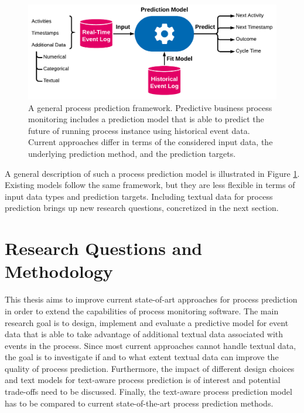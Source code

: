 \begin{figure}[htbp!]
	\centering
	\includegraphics[width=\textwidth]{figures/problem-description}
	\caption[A general process prediction framework]{A general process prediction framework. Predictive business process monitoring includes a prediction model that is able to predict the future of running process instance using historical event data. Current approaches differ in terms of the considered input data, the underlying prediction method, and the prediction targets.}
	\label{fig:/problem-description}
\end{figure}

A general description of such a process prediction model is illustrated in Figure \ref{fig:/problem-description}.
Existing models follow the same framework, but they are less flexible in terms of input data types and prediction targets.
Including textual data for process prediction brings up new research questions, concretized in the next section.

\section{Research Questions and Methodology}\label{sec:methodology}

This thesis aims to improve current state-of-art approaches for process prediction in order to extend the capabilities of process monitoring software.
The main research goal is to design, implement and evaluate a predictive model for event data that is able to take advantage of additional textual data associated with events in the process.
Since most current approaches cannot handle textual data, the goal is to investigate if and to what extent textual data can improve the quality of process prediction.
Furthermore, the impact of different design choices and text models for text-aware process prediction is of interest and potential trade-offs need to be discussed.
Finally, the text-aware process prediction model has to be compared to current state-of-the-art process prediction methods.

